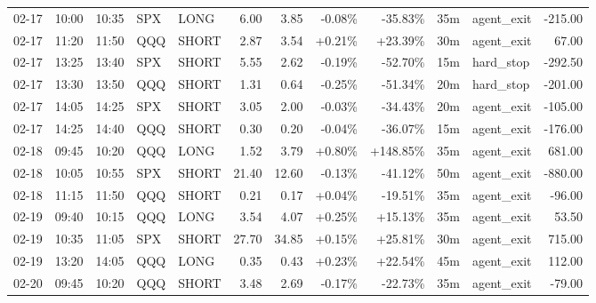 \documentclass[11pt,a4paper,twoside]{article}
\begin{document}
\begin{center}
\begin{longtable}{>{\color{txtmain}}l l l l l r r r r r >{\color{txtmain}}l r}
02-17 & 10:00 & 10:35 & SPX & LONG & 6.00 & 3.85 & \textcolor{lossred}{-0.08\%} & \textcolor{lossred}{-35.83\%} & 35m & agent\_exit & \textcolor{lossred}{-215.00} \\
02-17 & 11:20 & 11:50 & QQQ & SHORT & 2.87 & 3.54 & \textcolor{wingreen}{+0.21\%} & \textcolor{wingreen}{+23.39\%} & 30m & agent\_exit & \textcolor{wingreen}{67.00} \\
02-17 & 13:25 & 13:40 & SPX & SHORT & 5.55 & 2.62 & \textcolor{lossred}{-0.19\%} & \textcolor{lossred}{-52.70\%} & 15m & hard\_stop & \textcolor{lossred}{-292.50} \\
02-17 & 13:30 & 13:50 & QQQ & SHORT & 1.31 & 0.64 & \textcolor{lossred}{-0.25\%} & \textcolor{lossred}{-51.34\%} & 20m & hard\_stop & \textcolor{lossred}{-201.00} \\
02-17 & 14:05 & 14:25 & SPX & SHORT & 3.05 & 2.00 & \textcolor{lossred}{-0.03\%} & \textcolor{lossred}{-34.43\%} & 20m & agent\_exit & \textcolor{lossred}{-105.00} \\
02-17 & 14:25 & 14:40 & QQQ & SHORT & 0.30 & 0.20 & \textcolor{lossred}{-0.04\%} & \textcolor{lossred}{-36.07\%} & 15m & agent\_exit & \textcolor{lossred}{-176.00} \\
02-18 & 09:45 & 10:20 & QQQ & LONG & 1.52 & 3.79 & \textcolor{wingreen}{+0.80\%} & \textcolor{wingreen}{+148.85\%} & 35m & agent\_exit & \textcolor{wingreen}{681.00} \\
02-18 & 10:05 & 10:55 & SPX & SHORT & 21.40 & 12.60 & \textcolor{lossred}{-0.13\%} & \textcolor{lossred}{-41.12\%} & 50m & agent\_exit & \textcolor{lossred}{-880.00} \\
02-18 & 11:15 & 11:50 & QQQ & SHORT & 0.21 & 0.17 & \textcolor{wingreen}{+0.04\%} & \textcolor{lossred}{-19.51\%} & 35m & agent\_exit & \textcolor{lossred}{-96.00} \\
02-19 & 09:40 & 10:15 & QQQ & LONG & 3.54 & 4.07 & \textcolor{wingreen}{+0.25\%} & \textcolor{wingreen}{+15.13\%} & 35m & agent\_exit & \textcolor{wingreen}{53.50} \\
02-19 & 10:35 & 11:05 & SPX & SHORT & 27.70 & 34.85 & \textcolor{wingreen}{+0.15\%} & \textcolor{wingreen}{+25.81\%} & 30m & agent\_exit & \textcolor{wingreen}{715.00} \\
02-19 & 13:20 & 14:05 & QQQ & LONG & 0.35 & 0.43 & \textcolor{wingreen}{+0.23\%} & \textcolor{wingreen}{+22.54\%} & 45m & agent\_exit & \textcolor{wingreen}{112.00} \\
02-20 & 09:45 & 10:20 & QQQ & SHORT & 3.48 & 2.69 & \textcolor{lossred}{-0.17\%} & \textcolor{lossred}{-22.73\%} & 35m & agent\_exit & \textcolor{lossred}{-79.00} \\

\end{longtable}
\end{center}
\end{document}
